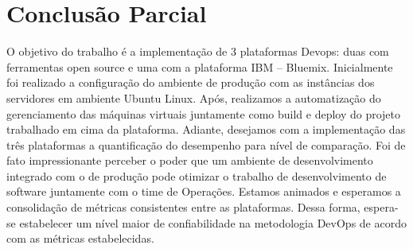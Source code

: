 \section{Conclusão Parcial}

 O objetivo do trabalho é a implementação de 3 plataformas Devops: duas com ferramentas open source e uma com a plataforma IBM – Bluemix. Inicialmente foi realizado a configuração do ambiente de produção com as instâncias dos servidores em ambiente Ubuntu Linux. Após, realizamos a automatização do gerenciamento das máquinas virtuais juntamente como build e deploy do projeto trabalhado em cima da plataforma. Adiante, desejamos com a implementação das três plataformas a quantificação do desempenho para nível de comparação. Foi de fato impressionante perceber o poder que um ambiente de desenvolvimento integrado com o de produção   pode otimizar o trabalho de desenvolvimento de software juntamente com o time de Operações. Estamos animados e esperamos a consolidação de métricas consistentes entre as plataformas. Dessa forma, espera-se estabelecer um nível maior de confiabilidade na metodologia DevOps de acordo com as métricas estabelecidas.
